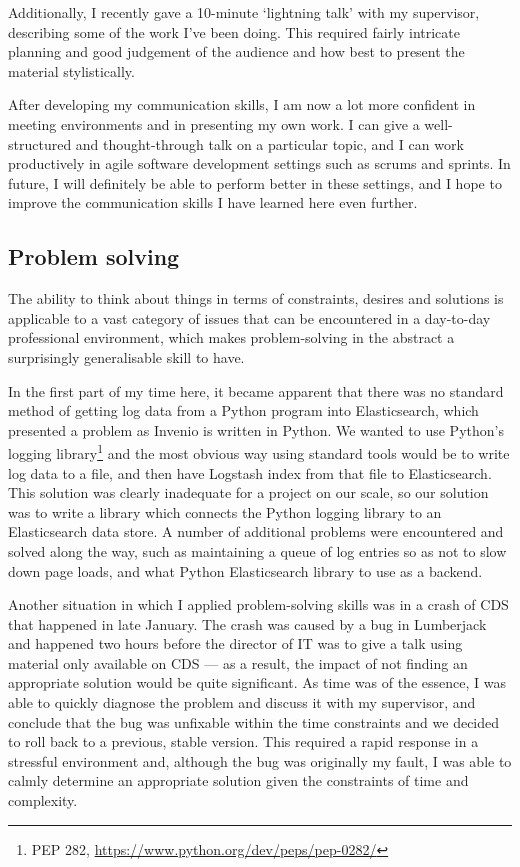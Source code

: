 \documentclass[a4paper,11pt]{article} %
\begin{document}
Additionally, I recently gave a 10-minute `lightning talk' with my supervisor, describing some of the work I've been doing.  This required fairly intricate planning and good judgement of the audience and how best to present the material stylistically.

After developing my communication skills, I am now a lot more confident in meeting environments and in presenting my own work.  I can give a well-structured and thought-through talk on a particular topic, and I can work productively in agile software development settings such as scrums and sprints.  In future, I will definitely be able to perform better in these settings, and I hope to improve the communication skills I have learned here even further.

\subsection{Problem solving}
\label{sec:transferable.organisation}
The ability to think about things in terms of constraints, desires and solutions is applicable to a vast category of issues that can be encountered in a day-to-day professional environment, which makes problem-solving in the abstract a surprisingly generalisable skill to have.

In the first part of my time here, it became apparent that there was no standard method of getting log data from a Python program into Elasticsearch, which presented a problem as Invenio is written in Python.  We wanted to use Python's logging library\footnote{PEP 282, \url{https://www.python.org/dev/peps/pep-0282/}} and the most obvious way using standard tools would be to write log data to a file, and then have Logstash index from that file to Elasticsearch.  This solution was clearly inadequate for a project on our scale, so our solution was to write a library which connects the Python logging library to an Elasticsearch data store.  A number of additional problems were encountered and solved along the way, such as maintaining a queue of log entries so as not to slow down page loads, and what Python Elasticsearch library to use as a backend.

Another situation in which I applied problem-solving skills was in a crash of CDS that happened in late January.  The crash was caused by a bug in Lumberjack and happened two hours before the director of IT was to give a talk using material only available on CDS --- as a result, the impact of not finding an appropriate solution would be quite significant.  As time was of the essence, I was able to quickly diagnose the problem and discuss it with my supervisor, and conclude that the bug was unfixable within the time constraints and we decided to roll back to a previous, stable version.  This required a rapid response in a stressful environment and, although the bug was originally my fault, I was able to calmly determine an appropriate solution given the constraints of time and complexity.
\end{document}
